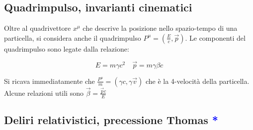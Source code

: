\subsection{Quadrimpulso, invarianti cinematici}

Oltre al quadrivettore $x^\mu$ che descrive la posizione nello spazio-tempo di una particella, si considera anche il quadrimpulso $P^\mu = (\frac{E}{c}, \vec{p})$. Le componenti del quadrimpulso sono legate dalla relazione:

\begin{equation*}
E = m \gamma c^2 \quad \vec{p} = m \gamma \beta c
\end{equation*}

Si ricava immediatamente che $ \frac{P^\mu}{m} = (\gamma c, \gamma \vec{v})$ che è la 4-velocità della particella. Alcune relazioni utili sono $\vec{\beta} = \frac{\vec{p} c}{E}$


\subsection{Deliri relativistici, precessione Thomas \textcolor{blue}{*}}
